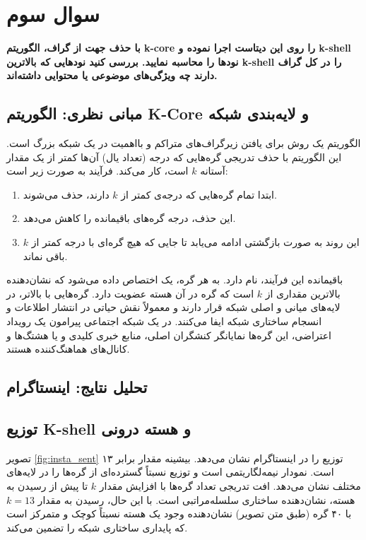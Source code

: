 \documentclass{article}
\begin{document}
\section{سوال سوم}
\textbf{
با حذف جهت از گراف، الگوریتم k-core را روی این دیتاست اجرا نموده و k-shell نودها را محاسبه نمایید.
بررسی کنید نودهایی که بالاترین k-shell را در کل گراف دارند چه ویژگی‌های موضوعی یا محتوایی داشته‌اند.}
\\

	\subsection{مبانی نظری: الگوریتم K-Core و لایه‌بندی شبکه}
	الگوریتم  یک روش برای یافتن زیرگراف‌های متراکم و بااهمیت در یک شبکه بزرگ است. این الگوریتم با حذف تدریجی گره‌هایی که درجه (تعداد یال) آن‌ها کمتر از یک مقدار آستانه \(k\) است، کار می‌کند. فرآیند به صورت زیر است:
	\begin{enumerate}
		\item ابتدا تمام گره‌هایی که درجه‌ی کمتر از \(k\) دارند، حذف می‌شوند.
		\item این حذف، درجه گره‌های باقیمانده را کاهش می‌دهد.
		\item این روند به صورت بازگشتی ادامه می‌یابد تا جایی که هیچ گره‌ای با درجه کمتر از \(k\) باقی نماند.
	\end{enumerate}
	باقیمانده این فرآیند،  نام دارد. به هر گره، یک  اختصاص داده می‌شود که نشان‌دهنده بالاترین مقداری از \(k\) است که گره در آن هسته عضویت دارد. گره‌هایی با  بالاتر، در لایه‌های میانی و اصلی شبکه قرار دارند و معمولاً نقش حیاتی در انتشار اطلاعات و انسجام ساختاری شبکه ایفا می‌کنند. در یک شبکه اجتماعی پیرامون یک رویداد اعتراضی، این گره‌ها نمایانگر کنشگران اصلی، منابع خبری کلیدی و یا هشتگ‌ها و کانال‌های هماهنگ‌کننده هستند.
	
	\subsection*{تحلیل نتایج: اینستاگرام}
	\subsection*{توزیع K-shell و هسته درونی}
	تصویر \ref{fig:insta_sent} توزیع  را در اینستاگرام نشان می‌دهد. بیشینه مقدار  برابر ۱۳ است. نمودار نیمه‌لگاریتمی است و توزیع نسبتاً گسترده‌ای از گره‌ها را در لایه‌های مختلف نشان می‌دهد. افت تدریجی تعداد گره‌ها با افزایش مقدار \(k\) تا پیش از رسیدن به هسته، نشان‌دهنده ساختاری سلسله‌مراتبی است. با این حال، رسیدن به مقدار \(k=13\) با ۴۰ گره (طبق متن تصویر) نشان‌دهنده وجود یک هسته نسبتاً کوچک و متمرکز است که پایداری ساختاری شبکه را تضمین می‌کند.
	
\end{document}
